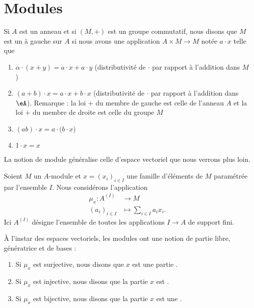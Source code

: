 \section{Modules}

Si \( A\) est un anneau et si \( (M,+)\) est un groupe commutatif, nous disons que \( M\) est un  à gauche sur \( A\) si nous avons une application \( A\times M\to M\) notée \( a\cdot x\) telle que
\begin{enumerate}
    \item
       $\alpha\cdot(x + y) = a\cdot x + a\cdot y$  (distributivité de $\cdot$ par rapport à l'addition dans $M$)
   \item $(a + b) \cdot x = a \cdot x + b \cdot x$ (distributivité de $\cdot$ par rapport à l'addition dans \( \eA\)). Remarque :  la loi $+$ du membre de gauche est celle de l'anneau $A$ et la loi $+$ du membre de droite est celle du groupe $M$
   \item $(ab) \cdot x = a \cdot (b \cdot x$)
   \item $1 \cdot x = x$ 
\end{enumerate}

\begin{remark}
    La notion de module généralise celle d'espace vectoriel que nous verrons plus loin.
\end{remark}

Soient \( M\) un \( A\)-module et \( x=(x_i)_{i\in I}\) une famille d'éléments de \( M\) paramétrée par l'ensemble \( I\). Nous considérons l'application
\begin{equation}
    \begin{aligned}
        \mu_x\colon A^{(I)}&\to M \\
        (a_i)_{i\in I}&\mapsto \sum_{i\in I}a_ix_i.
    \end{aligned}
\end{equation}
Ici \( A^{(I)}\) désigne l'ensemble de toutes les applications \( I\to A\) de support fini.  

\begin{definition}      \label{DefBasePouyKj}
    À l'instar des espaces vectoriels, les modules ont une notion de partie libre, génératrice et de bases :
    \begin{enumerate}
        \item
            Si \( \mu_x\) est surjective, nous disons que \( x\) est une partie .
        \item
            Si \( \mu_x\) est injective, nous disons que la partie \( x\) est .
        \item
            Si \( \mu_x\) est bijective, nous disons que la partie \( x\) est une .
    \end{enumerate}
\end{definition}


